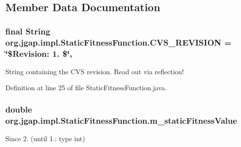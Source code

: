 \subsection{Member Data Documentation}
\hypertarget{classorg_1_1jgap_1_1impl_1_1_static_fitness_function_af3a56f02acc3ec5483449ee5dee8b9a1}{
\subsubsection[{C\-V\-S\-\_\-\-R\-E\-V\-I\-S\-I\-O\-N}]{\setlength{\rightskip}{0pt plus 5cm}final String org.\-jgap.\-impl.\-Static\-Fitness\-Function.\-C\-V\-S\-\_\-\-R\-E\-V\-I\-S\-I\-O\-N = \char`\"{}\$Revision\-: 1. \$\char`\"{}\hspace{0.3cm}{\ttfamily [static]}, {\ttfamily [private]}}}\label{classorg_1_1jgap_1_1impl_1_1_static_fitness_function_af3a56f02acc3ec5483449ee5dee8b9a1}
String containing the C\-V\-S revision. Read out via reflection! 

Definition at line 25 of file Static\-Fitness\-Function.\-java.

\hypertarget{classorg_1_1jgap_1_1impl_1_1_static_fitness_function_a5879bc886826bcc49e51f3dc8e44a365}{
\subsubsection[{m\-\_\-static\-Fitness\-Value}]{\setlength{\rightskip}{0pt plus 5cm}double org.\-jgap.\-impl.\-Static\-Fitness\-Function.\-m\-\_\-static\-Fitness\-Value\hspace{0.3cm}{\ttfamily [private]}}}\label{classorg_1_1jgap_1_1impl_1_1_static_fitness_function_a5879bc886826bcc49e51f3dc8e44a365}
\begin{DoxySince}{Since}
2. (until 1.\-: type int) 
\end{DoxySince}


